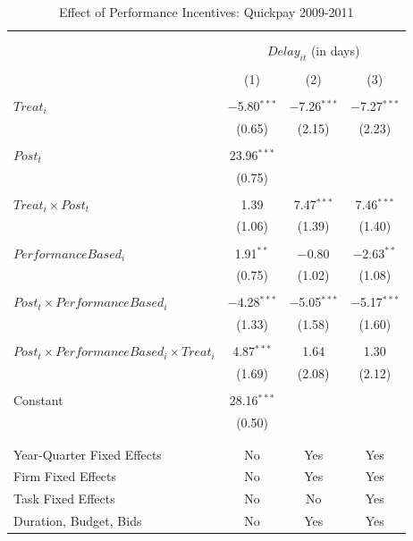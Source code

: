 \documentclass[
]{article}
\begin{document}
\begin{table}[H] \centering 
  \caption{Effect of Performance Incentives: Quickpay 2009-2011} 
  \label{} 
\small 
\begin{tabular}{@{\extracolsep{-2pt}}lccc} 
\\[-1.8ex]\hline 
\hline \\[-1.8ex] 
\\[-1.8ex] & \multicolumn{3}{c}{$Delay_{it}$ (in days)} \\ 
\\[-1.8ex] & (1) & (2) & (3)\\ 
\hline \\[-1.8ex] 
 $Treat_i$ & $-$5.80$^{***}$ & $-$7.26$^{***}$ & $-$7.27$^{***}$ \\ 
  & (0.65) & (2.15) & (2.23) \\ 
  & & & \\ 
 $Post_t$ & 23.96$^{***}$ &  &  \\ 
  & (0.75) &  &  \\ 
  & & & \\ 
 $Treat_i \times Post_t$ & 1.39 & 7.47$^{***}$ & 7.46$^{***}$ \\ 
  & (1.06) & (1.39) & (1.40) \\ 
  & & & \\ 
 $PerformanceBased_i$ & 1.91$^{**}$ & $-$0.80 & $-$2.63$^{**}$ \\ 
  & (0.75) & (1.02) & (1.08) \\ 
  & & & \\ 
 $Post_t \times PerformanceBased_i$ & $-$4.28$^{***}$ & $-$5.05$^{***}$ & $-$5.17$^{***}$ \\ 
  & (1.33) & (1.58) & (1.60) \\ 
  & & & \\ 
 $Post_t \times PerformanceBased_i \times Treat_i$ & 4.87$^{***}$ & 1.64 & 1.30 \\ 
  & (1.69) & (2.08) & (2.12) \\ 
  & & & \\ 
 Constant & 28.16$^{***}$ &  &  \\ 
  & (0.50) &  &  \\ 
  & & & \\ 
\hline \\[-1.8ex] 
Year-Quarter Fixed Effects & No & Yes & Yes \\ 
Firm Fixed Effects & No & Yes & Yes \\ 
Task Fixed Effects & No & No & Yes \\ 
Duration, Budget, Bids & No & Yes & Yes \\ 

\end{tabular}
\end{table}
\end{document}
